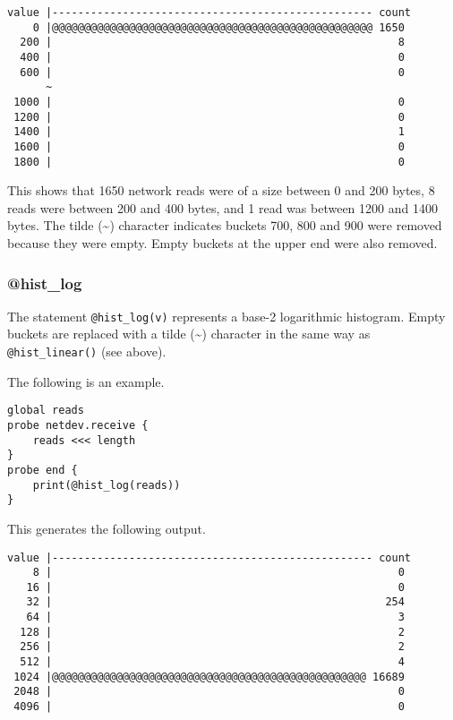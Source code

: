 \documentclass[twoside,english]{article}
\newenvironment{vindent}
{\begin{list}{}{\setlength{\listparindent}{6pt}}
\item[]}
{\end{list}}
\begin{document}
\pagebreak
\begin{vindent}
\begin{verbatim}
value |-------------------------------------------------- count
    0 |@@@@@@@@@@@@@@@@@@@@@@@@@@@@@@@@@@@@@@@@@@@@@@@@@@ 1650
  200 |                                                      8
  400 |                                                      0
  600 |                                                      0
      ~
 1000 |                                                      0
 1200 |                                                      0
 1400 |                                                      1
 1600 |                                                      0
 1800 |                                                      0
\end{verbatim}
\end{vindent}
This shows that 1650 network reads were of a size between 0 and 200 bytes, 
8 reads were between 200 and 400 bytes, and 1 read was between
1200 and 1400 bytes.  The tilde (\textasciitilde{}) character indicates 
buckets 700, 800 and 900 were removed because they were empty.
Empty buckets at the upper end were also removed.

\subsubsection{@hist\_log}
The statement \texttt{@hist\_log(v)} represents a base-2 logarithmic 
histogram.  Empty buckets are replaced with a tilde (\textasciitilde{})
character in the same way as \texttt{@hist\_linear()} (see above).

The following is an example.

\begin{vindent}
\begin{verbatim}
global reads
probe netdev.receive {
    reads <<< length
}
probe end {
    print(@hist_log(reads))
}
\end{verbatim}
\end{vindent}
This generates the following output.

\begin{vindent}
\begin{verbatim}
value |-------------------------------------------------- count
    8 |                                                      0
   16 |                                                      0
   32 |                                                    254
   64 |                                                      3
  128 |                                                      2
  256 |                                                      2
  512 |                                                      4
 1024 |@@@@@@@@@@@@@@@@@@@@@@@@@@@@@@@@@@@@@@@@@@@@@@@@@ 16689
 2048 |                                                      0
 4096 |                                                      0
\end{verbatim}
\end{vindent}
\end{document}
